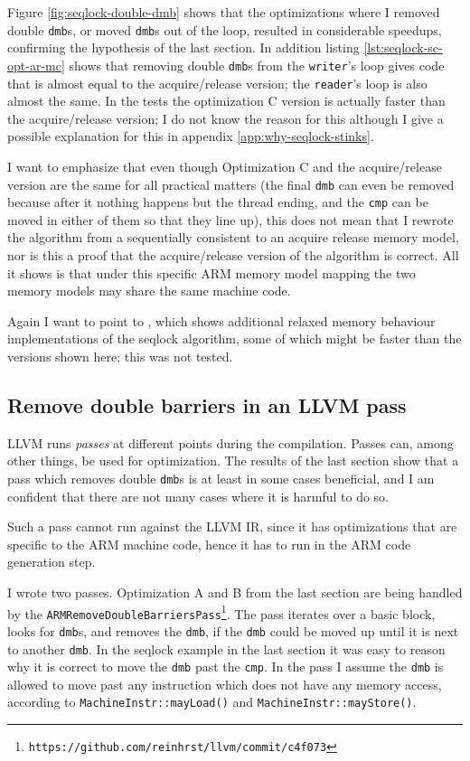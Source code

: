 \documentclass[journal]{IEEEtran}
\begin{document}
Figure \ref{fig:seqlock-double-dmb} shows that the optimizations where I removed double \texttt{dmb}s, or moved \texttt{dmb}s out of the loop, resulted in considerable speedups, confirming the hypothesis of the last section.
In addition listing \ref{lst:seqlock-sc-opt-ar-mc} shows that removing double \texttt{dmb}s from the \texttt{writer}'s loop gives code that is almost equal to the acquire/release version; the \texttt{reader}'s loop is also almost the same.
In the tests the optimization C version is actually faster than the acquire/release version; I do not know the reason for this although I give a possible explanation for this in appendix \ref{app:why-seqlock-stinks}.

I want to emphasize that even though Optimization C and the acquire/release version are the same for all practical matters (the final \texttt{dmb} can even be removed because after it nothing happens but the thread ending, and the \texttt{cmp} can be moved in either of them so that they line up), this does not mean that I rewrote the algorithm from a sequentially consistent to an acquire release memory model, nor is this a proof that the acquire/release version of the algorithm is correct.
All it shows is that under this specific ARM memory model mapping the two memory models may share the same machine code.

Again I want to point to \cite{boehm2012can}, which shows additional relaxed memory behaviour implementations of the seqlock algorithm, some of which might be faster than the versions shown here; this was not tested.
\subsection{Remove double barriers in an LLVM pass}

LLVM runs \emph{passes} at different points during the compilation.
Passes can, among other things, be used for optimization.
The results of the last section show that a pass which removes double \texttt{dmb}s is at least in some cases beneficial, and I am confident that there are not many cases where it is harmful to do so.

Such a pass cannot run against the LLVM IR, since it has optimizations that are specific to the ARM machine code, hence it has to run in the ARM code generation step.

I wrote two passes.
Optimization A and B from the last section are being handled by the \texttt{ARM\-Remove\-Double\-Barriers\-Pass}\footnote{\texttt{https://github.com/reinhrst/llvm/commit/c4f073}}.
The pass iterates over a basic block, looks for \texttt{dmb}s, and removes the \texttt{dmb}, if the \texttt{dmb} could be moved up until it is next to another \texttt{dmb}.
In the seqlock example in the last section it was easy to reason why it is correct to move the \texttt{dmb} past the \texttt{cmp}.
In the pass I assume  the \texttt{dmb} is allowed to move past any instruction which does not have any memory access, according to \texttt{MachineInstr::mayLoad()} and \texttt{MachineInstr::mayStore()}.
\end{document}
